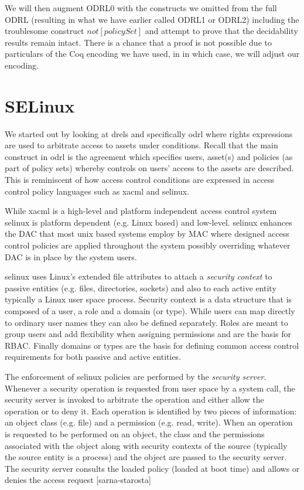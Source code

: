 We will then augment ODRL0 with the constructs we omitted from the full ODRL (resulting in what we have earlier called ODRL1 or ODRL2) including the troublesome construct $not[policySet]$ and attempt to prove that the decidability results remain intact. There is a chance that a proof is not possible due to particulars of the Coq encoding we have used, in in which case, we will adjust our encoding.

\section{SELinux}
 
We started out by looking at \ac{drel}s and specifically \ac{odrl} where rights expressions are used to arbitrate access to assets under conditions. Recall that the main construct in \ac{odrl} is the agreement which specifies users, asset(s) and policies (as part of policy sets) whereby controls on users' access to the assets are described. This is reminiscent of how access control conditions are expressed in access control policy languages such as \ac{xacml} and \ac{selinux}.

While \ac{xacml} is a high-level and platform independent access control system \ac{selinux} is platform dependent (e.g. Linux based) and low-level. \ac{selinux} enhances the \ac{DAC} that most unix based systems employ by \ac{MAC} where designed access control policies are applied throughout the system possibly overriding whatever \ac{DAC} is in place by the system users. 

\ac{selinux} uses Linux's extended file attributes to attach a \emph{security context} to passive entities (e.g. files, directories, sockets) and also to each active entity typically a Linux user space process. Security context is a data structure that is composed of a user, a role and a domain (or type). While users can map directly to ordinary user names they can also be defined separately. Roles are meant to group users and add flexibility when assigning permissions and are the basis for \ac{RBAC}. Finally domains or types are the basis for defining common access control requirements for both passive and active entities. 


The enforcement of \ac{selinux} policies are performed by the \emph{security server}. Whenever a security operation is requested from user space by a system call, the security server is invoked to arbitrate the operation and either allow the operation or to deny it. Each operation is identified by two pieces of information: an object class (e.g. file) and a permission (e.g. read, write). When an operation is requested to be performed on an object, the class and the permissions associated with the object along with security contexts of the source (typically the source entity is a process) and the object are passed to the security server. The security server consults the loaded policy (loaded at 
boot time) and allows or denies the access request [sarna-starosta]

